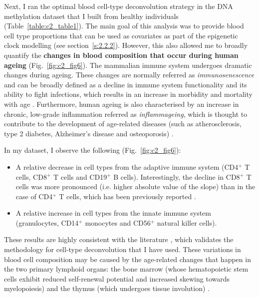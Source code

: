 Next, I ran the optimal blood cell-type deconvolution strategy in the DNA methylation dataset that I built from healthy individuals (Table~\ref{table:c2_table1}). The main goal of this analysis was to provide blood cell type proportions that can be used as covariates as part of the epigenetic clock modelling (see section~\ref{s:2.2.2}). However, this also allowed me to broadly quantify the \textbf{changes in blood composition that occur during human ageing} (Fig.~\ref{fig:c2_fig6}). The mammalian immune system undergoes dramatic changes during ageing. These changes are normally referred as \textit{immunosenescence} and can be broadly defined as a decline in immune system functionality and its ability to fight infections, which results in an increase in morbidity and mortality with age \cite{Nikolich-Zugich2018}. Furthermore, human ageing is also characterised by an increase in chronic, low-grade inflammation referred as \textit{inflammageing}, which is thought to contribute to the development of age-related diseases (such as atherosclerosis, type 2 diabetes, Alzheimer’s disease and osteoporosis) \cite{Franceschi2007}.

\bigskip

In my dataset, I observe the following (Fig.~\ref{fig:c2_fig6}):

\begin{itemize}
	
	\item A relative decrease in cell types from the adaptive immune system (CD4$^+$ T cells, CD8$^+$ T cells and CD19$^+$ B cells). Interestingly, the decline in CD8$^+$ T cells was more pronounced (i.e. higher absolute value of the slope) than in the case of CD4$^+$ T cells, which has been previously reported \cite{Czesnikiewicz-Guzik2008}. 
	
	\item A relative increase in cell types from the innate immune system (granulocytes, CD14$^+$ monocytes and CD56$^+$ natural killer cells).
	
\end{itemize}

These results are highly consistent with the literature \cite{Jaffe2014,Czesnikiewicz-Guzik2008,Kuranda2011,Chen2016a,Seidler2010,Manser2016}, which validates the methodology for cell-type deconvolution that I have used. These variations in blood cell composition may be caused by the age-related changes that happen in the two primary lymphoid organs: the bone marrow (whose hematopoietic stem cells exhibit reduced self-renewal potential and increased skewing towards myelopoiesis) and the thymus (which undergoes tissue involution)  \cite{Chinn2012}. 


